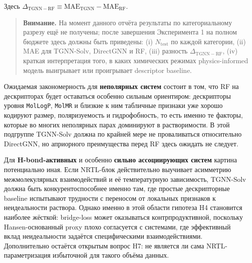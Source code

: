 \documentclass[11pt]{article}
\newcommand{\warnnote}[1]{\begin{quote}\textbf{Внимание.} #1\end{quote}}
\begin{document}
\begin{table}[H]
\centering
\small
\setlength{\tabcolsep}{3pt}
\caption{Framework-таблица для анализа ошибок по категориям систем.}
\label{tab:error-category-framework}
\end{table}

Здесь $\Delta_{\mathrm{TGNN-RF}} \equiv \mathrm{MAE}_{\mathrm{TGNN}} - \mathrm{MAE}_{\mathrm{RF}}$.

\warnnote{На момент данного отчёта результаты по категориальному разрезу ещё не получены; после завершения Эксперимента 1 на полном бюджете здесь должны быть приведены: (i) $N_{\mathrm{test}}$ по каждой категории, (ii) MAE для TGNN-Solv, DirectGNN и RF, (iii) разность $\Delta_{\mathrm{TGNN-RF}}$, (iv) краткая интерпретация того, в каких химических режимах physics-informed модель выигрывает или проигрывает descriptor baseline.}

Ожидаемая закономерность для \textbf{неполярных систем} состоит в том, что RF на дескрипторах будет оставаться особенно сильным ориентиром: дескрипторы уровня \texttt{MolLogP}, \texttt{MolMR} и близкие к ним табличные признаки уже хорошо кодируют размер, поляризуемость и гидрофобность, то есть именно те факторы, которые во многих неполярных парах доминируют в растворимости. В этой подгруппе TGNN-Solv должна по крайней мере не проваливаться относительно DirectGNN, но априорного преимущества перед RF здесь ожидать не следует.

Для \textbf{H-bond-активных} и особенно \textbf{сильно ассоциирующих систем} картина потенциально иная. Если NRTL-блок действительно выучивает асимметрию межмолекулярных взаимодействий и её температурную зависимость, TGNN-Solv должна быть конкурентоспособнее именно там, где простые дескрипторные baseline испытывают трудности с переносом от локальных признаков к неидеальности раствора. Однако именно в этой области гипотеза H4 становится наиболее жёсткой: bridge-loss может оказываться контрпродуктивной, поскольку Hansen-основанный proxy плохо согласуется с системами, где эффективный вклад неидеальности задаётся специфическими взаимодействиями. Дополнительно остаётся открытым вопрос H7: не является ли сама NRTL-параметризация избыточной для такого объёма данных.
\end{document}
